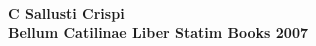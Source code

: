 \documentclass[10pt]{article}
\begin{document}
\obeylines%
\parindent=0pt

\thispagestyle{empty}
\begin{centering}
~\\\vskip2in\huge\bf C Sallusti Crispi \\ Bellum Catilinae\vskip2in Liber Statim Books 2007
\end{centering}
\vfill

\newpage
~
\thispagestyle{empty}
\newpage



\end{document}
